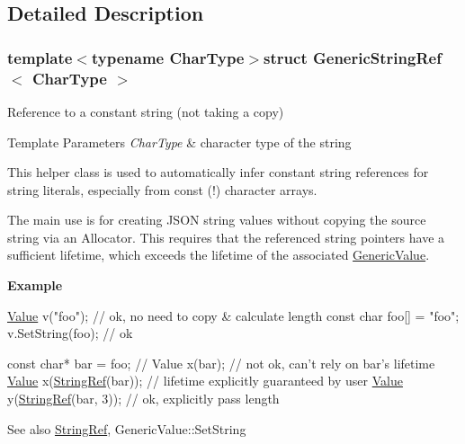 \subsection{Detailed Description}
\subsubsection*{template$<$typename Char\+Type$>$struct Generic\+String\+Ref$<$ Char\+Type $>$}

Reference to a constant string (not taking a copy) 


\begin{DoxyTemplParams}{Template Parameters}
{\em Char\+Type} & character type of the string\\
\hline
\end{DoxyTemplParams}
This helper class is used to automatically infer constant string references for string literals, especially from {\ttfamily const} {\bfseries }(!) character arrays.

The main use is for creating J\+S\+O\+N string values without copying the source string via an Allocator. This requires that the referenced string pointers have a sufficient lifetime, which exceeds the lifetime of the associated \hyperlink{class_generic_value}{Generic\+Value}.

{\bfseries Example} 
\begin{DoxyCode}
\hyperlink{class_generic_value}{Value} v(\textcolor{stringliteral}{"foo"});   \textcolor{comment}{// ok, no need to copy & calculate length}
\textcolor{keyword}{const} \textcolor{keywordtype}{char} foo[] = \textcolor{stringliteral}{"foo"};
v.SetString(foo); \textcolor{comment}{// ok}

\textcolor{keyword}{const} \textcolor{keywordtype}{char}* bar = foo;
\textcolor{comment}{// Value x(bar); // not ok, can't rely on bar's lifetime}
\hyperlink{class_generic_value}{Value} x(\hyperlink{struct_generic_string_ref_aa6b9fd9f6aa49405a574c362ba9af6b5}{StringRef}(bar)); \textcolor{comment}{// lifetime explicitly guaranteed by user}
\hyperlink{class_generic_value}{Value} y(\hyperlink{struct_generic_string_ref_aa6b9fd9f6aa49405a574c362ba9af6b5}{StringRef}(bar, 3));  \textcolor{comment}{// ok, explicitly pass length}
\end{DoxyCode}


\begin{DoxySeeAlso}{See also}
\hyperlink{struct_generic_string_ref_aa6b9fd9f6aa49405a574c362ba9af6b5}{String\+Ref}, Generic\+Value\+::\+Set\+String 
\end{DoxySeeAlso}


